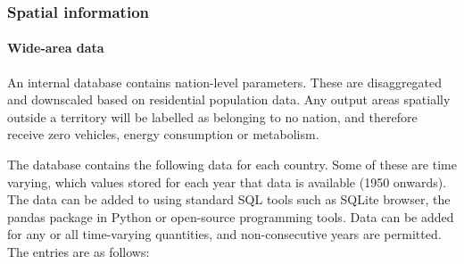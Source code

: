 \documentclass[letterpaper,10pt,english]{sphinxmanual}
\begin{document}
\subsubsection{Spatial information}
\label{\detokenize{OtherManuals/LQF_Manual:spatial-information}}

\paragraph{Wide-area data}
\label{\detokenize{OtherManuals/LQF_Manual:wide-area-data}}
An internal database contains nation-level parameters. These are
disaggregated and downscaled based on residential population data. Any
output areas spatially outside a territory will be labelled as belonging
to no nation, and therefore receive zero vehicles, energy consumption or
metabolism.

The database contains the following data for each country. Some of these
are time varying, which values stored for each year that data is
available (1950 onwards). The data can be added to using standard SQL
tools such as SQLite browser, the pandas package in Python or
open-source programming tools. Data can be added for any or all
time-varying quantities, and non-consecutive years are permitted. The
entries are as follows:
\end{document}
